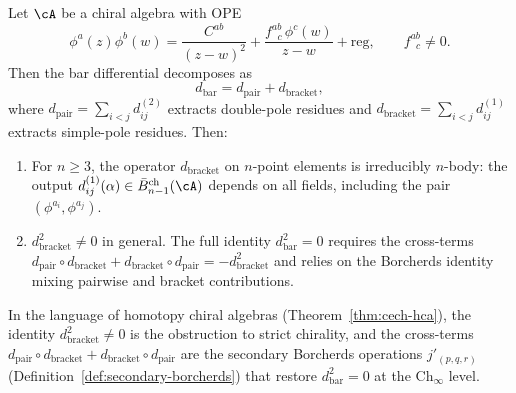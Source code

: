 \begin{proposition}
\label{prop:nonabelian-kernel-nonfactorization}
Let\/ $\cA$ be a chiral algebra with OPE
\[
\phi^a(z)\phi^b(w)
= \frac{C^{ab}}{(z-w)^2}
 + \frac{f^{ab}_{\;\;c}\, \phi^c(w)}{z-w}
 + \mathrm{reg},
\qquad f^{ab}_{\;\;c} \neq 0.
\]
Then the bar differential decomposes as
\begin{equation}\label{eq:bar-diff-pair-bracket}
d_{\mathrm{bar}} = d_{\mathrm{pair}} + d_{\mathrm{bracket}},
\end{equation}
where $d_{\mathrm{pair}} = \sum_{i<j} d_{ij}^{(2)}$ extracts
double-pole residues and
$d_{\mathrm{bracket}} = \sum_{i<j} d_{ij}^{(1)}$ extracts
simple-pole residues. Then:
\begin{enumerate}[label=\textup{(\roman*)}]
\item For $n \geq 3$, the operator $d_{\mathrm{bracket}}$ on
 $n$-point elements is irreducibly $n$-body: the output
 $d_{ij}^{(1)}(\alpha) \in \bar{B}^{\mathrm{ch}}_{n-1}(\cA)$
 depends on all fields, including the pair
 $(\phi^{a_i}, \phi^{a_j})$.
\item $d_{\mathrm{bracket}}^2 \neq 0$ in general. The full
 identity $d_{\mathrm{bar}}^2 = 0$ requires the cross-terms
 $d_{\mathrm{pair}} \circ d_{\mathrm{bracket}}
 + d_{\mathrm{bracket}} \circ d_{\mathrm{pair}}
 = -d_{\mathrm{bracket}}^2$
 and relies on the Borcherds identity mixing pairwise and
 bracket contributions.
\end{enumerate}

In the language of homotopy chiral algebras
(Theorem~\ref{thm:cech-hca}), the identity
$d_{\mathrm{bracket}}^2 \neq 0$ is the obstruction to strict
chirality, and the cross-terms
$d_{\mathrm{pair}} \circ d_{\mathrm{bracket}} +
d_{\mathrm{bracket}} \circ d_{\mathrm{pair}}$ are the
secondary Borcherds operations $j'_{(p,q,r)}$
(Definition~\ref{def:secondary-borcherds}) that restore
$d_{\mathrm{bar}}^2 = 0$ at the Ch$_\infty$ level.
\end{proposition}

